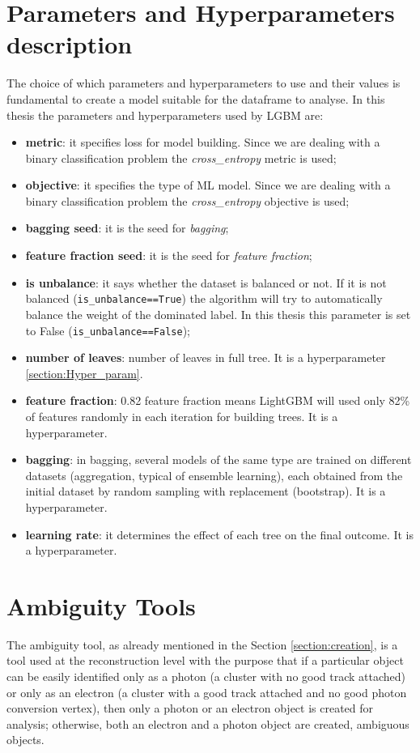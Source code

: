 \documentclass[a4paper, oneside, 11pt, openright]{book}
\begin{document}
	\chapter{Parameters and Hyperparameters description} \label{Appex:para}
		The choice of which parameters and hyperparameters to use and their values is fundamental to create a model suitable for the dataframe to analyse. In this thesis the parameters and hyperparameters used by LGBM are:
		\begin{itemize}
			\item \textbf{metric}: it specifies loss for model building. Since we are dealing with a binary classification problem the \textit{cross\_entropy} metric is used;
			\item \textbf{objective}: it specifies the type of ML model. Since we are dealing with a binary classification problem the \textit{cross\_entropy} objective is used;
			\item \textbf{bagging seed}: it is the seed for \textit{bagging};
			\item \textbf{feature fraction seed}: it is the seed for \textit{feature fraction};
			\item \textbf{is unbalance}: it says whether the dataset is balanced or not. If it is not balanced (\texttt{is\_unbalance==True}) the algorithm will try to automatically balance the weight of the dominated label. In this thesis this parameter is set to False (\texttt{is\_unbalance==False});
			\item \textbf{number of leaves}: number of leaves in full tree. It is a hyperparameter \ref{section:Hyper_param}.
			\item \textbf{feature fraction}: 0.82 feature fraction means LightGBM will used only 82\% of features randomly in each iteration for building trees. It is a hyperparameter.
			\item \textbf{bagging}: in bagging, several models of the same type are trained on different datasets (aggregation, typical of ensemble learning), each obtained from the initial dataset by random sampling with replacement (bootstrap). It is a hyperparameter.
			\item \textbf{learning rate}: it determines the effect of each tree on the final outcome. It is a hyperparameter.
		\end{itemize}
	
	\chapter{Ambiguity Tools} \label{Appex:amb}	
		The ambiguity tool, as already mentioned in the Section \ref{section:creation}, is a tool used at the reconstruction level with the purpose that if a particular object can be easily identified only as a photon (a cluster with no good track attached) or only as an electron (a cluster with a good track attached and no good photon conversion vertex), then only a photon or an electron object is created for analysis; otherwise, both an electron and a photon object are created, ambiguous objects. 
		
\end{document}
